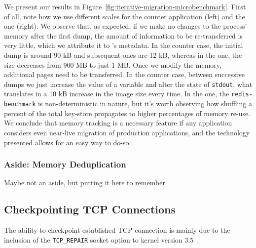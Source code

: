 We present our results in Figure~\ref{fig:iterative-migration-microbenchmark}.
First of all, note how we use different scales for the counter application (left) and the \redis one (right).
We observe that, as expected, if we make no changes to the process' memory after the first dump, the amount of information to be re-transferred is very little, which we attribute it to \criu's metadata.
In the counter case, the initial dump is around 90 kB and subsequent ones are 12 kB, whereas in the \redis one, the size decreases from 900 MB to just 1 MB.
Once we modify the memory, additional pages need to be transferred.
In the counter case, between successive dumps we just increase the value of a variable and alter the state of \texttt{stdout}, what translates in a 10 kB increase in the image size every time.
In the \redis one, the \texttt{redis-benchmark} is non-deterministic in nature, but it's worth observing how shuffling a percent of the total key-store propagates to higher percentages of memory re-use.
We conclude that memory tracking is a necessary feature if any application considers even near-live migration of production applications, and the technology presented allows for an easy way to do-so.


\subsubsection*{Aside: Memory Deduplication}

Maybe not an aside, but putting it here to remember



\subsection{Checkpointing TCP Connections}


The ability to checkpoint established TCP connection is mainly due to the inclusion of the \texttt{TCP\_REPAIR} socket option to kernel version $3.5$~\cite{tcp-connection-repair}.

